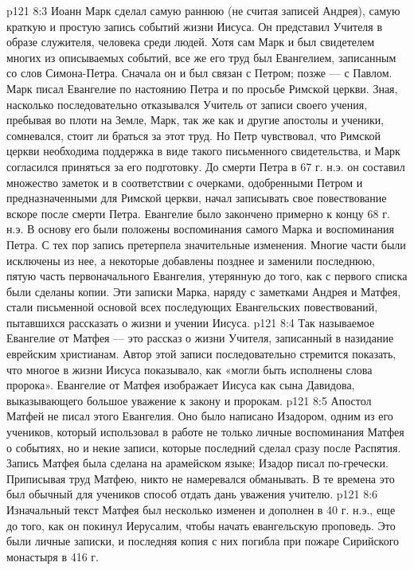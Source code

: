 \vs p121 8:3 \bibnobreakspace {} Иоанн Марк сделал самую раннюю (не считая записей Андрея), самую краткую и простую запись событий жизни Иисуса. Он представил Учителя в образе служителя, человека среди людей. Хотя сам Марк и был свидетелем многих из описываемых событий, все же его труд был Евангелием, записанным со слов Симона\hyp{}Петра. Сначала он и был связан с Петром; позже --- с Павлом. Марк писал Евангелие по настоянию Петра и по просьбе Римской церкви. Зная, насколько последовательно отказывался Учитель от записи своего учения, пребывая во плоти на Земле, Марк, так же как и другие апостолы и ученики, сомневался, стоит ли браться за этот труд. Но Петр чувствовал, что Римской церкви необходима поддержка в виде такого письменного свидетельства, и Марк согласился приняться за его подготовку. До смерти Петра в 67 г. н.э. он составил множество заметок и в соответствии с очерками, одобренными Петром и предназначенными для Римской церкви, начал записывать свое повествование вскоре после смерти Петра. Евангелие было закончено примерно к концу 68 г. н.э. В основу его были положены воспоминания самого Марка и воспоминания Петра. С тех пор запись претерпела значительные изменения. Многие части были исключены из нее, а некоторые добавлены позднее и заменили последнюю, пятую часть первоначального Евангелия, утерянную до того, как с первого списка были сделаны копии. Эти записки Марка, наряду с заметками Андрея и Матфея, стали письменной основой всех последующих Евангельских повествований, пытавшихся рассказать о жизни и учении Иисуса.
\vs p121 8:4 \pc {}\bibnobreakspace {} Так называемое Евангелие от Матфея --- это рассказ о жизни Учителя, записанный в назидание еврейским христианам. Автор этой записи последовательно стремится показать, что многое в жизни Иисуса показывало, как «могли быть исполнены слова пророка». Евангелие от Матфея изображает Иисуса как сына Давидова, выказывающего большое уважение к закону и пророкам.
\vs p121 8:5 Апостол Матфей не писал этого Евангелия. Оно было написано Изадором, одним из его учеников, который использовал в работе не только личные воспоминания Матфея о событиях, но и некие записи, которые последний сделал сразу после Распятия. Запись Матфея была сделана на арамейском языке; Изадор писал по\hyp{}гречески. Приписывая труд Матфею, никто не намеревался обманывать. В те времена это был обычный для учеников способ отдать дань уважения учителю.
\vs p121 8:6 Изначальный текст Матфея был несколько изменен и дополнен в 40 г. н.э., еще до того, как он покинул Иерусалим, чтобы начать евангельскую проповедь. Это были личные записки, и последняя копия с них погибла при пожаре Сирийского монастыря в 416 г.
